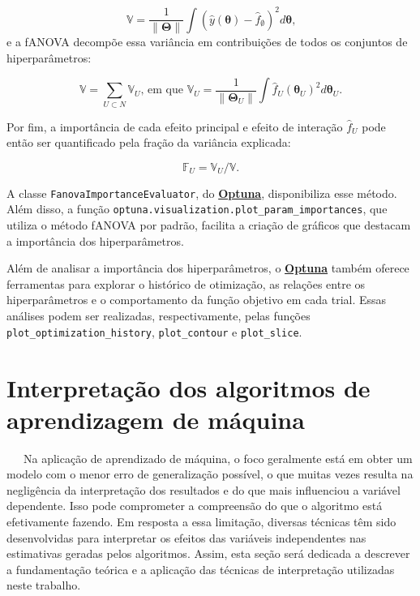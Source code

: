 \documentclass[
  12pt,
  a4paper,
]{scrreprt}
\begin{document}
\[
\mathbb{V} = \frac{1}{\|\boldsymbol{\Theta}\|} \int\left(\hat{y}\left(\boldsymbol{\theta}\right) - \hat{f}_{\emptyset}\right)^2 d \boldsymbol{\theta}\text{,}
\] e a fANOVA decompõe essa variância em contribuições de todos os
conjuntos de hiperparâmetros:

\[
\mathbb{V} = \sum_{U \subset N}\mathbb{V}_{U} \text{, em que } \mathbb{V}_U = \frac{1}{\|\boldsymbol{\Theta}_{U}\|} \int \hat{f}_U\left(\boldsymbol{\theta}_U\right)^2 d\boldsymbol{\theta}_U\text{.}
\]

\vspace{12pt}

Por fim, a importância de cada efeito principal e efeito de interação
\(\hat{f}_U\) pode então ser quantificado pela fração da variância
explicada:

\[
\mathbb{F}_{U} = \mathbb{V}_{U} / \mathbb{V}\text{.}
\]

\vspace{12pt}

A classe \texttt{FanovaImportanceEvaluator}, do
\href{https://optuna.org/}{\textbf{Optuna}}, disponibiliza esse método.
Além disso, a função
\texttt{optuna.visualization.plot\_param\_importances}, que utiliza o
método fANOVA por padrão, facilita a criação de gráficos que destacam a
importância dos hiperparâmetros.

\vspace{12pt}

Além de analisar a importância dos hiperparâmetros, o
\href{https://optuna.org/}{\textbf{Optuna}} também oferece ferramentas
para explorar o histórico de otimização, as relações entre os
hiperparâmetros e o comportamento da função objetivo em cada trial.
Essas análises podem ser realizadas, respectivamente, pelas funções
\texttt{plot\_optimization\_history}, \texttt{plot\_contour} e
\texttt{plot\_slice}.

\section{Interpretação dos algoritmos de aprendizagem de
máquina}\label{interpretauxe7uxe3o-dos-algoritmos-de-aprendizagem-de-muxe1quina}

~~~Na aplicação de aprendizado de máquina, o foco geralmente está em
obter um modelo com o menor erro de generalização possível, o que muitas
vezes resulta na negligência da interpretação dos resultados e do que
mais influenciou a variável dependente. Isso pode comprometer a
compreensão do que o algoritmo está efetivamente fazendo. Em resposta a
essa limitação, diversas técnicas têm sido desenvolvidas para
interpretar os efeitos das variáveis independentes nas estimativas
geradas pelos algoritmos. Assim, esta seção será dedicada a descrever a
fundamentação teórica e a aplicação das técnicas de interpretação
utilizadas neste trabalho.
\end{document}

